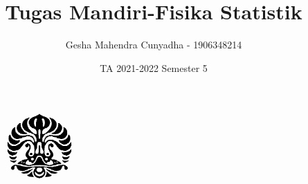 \documentclass[12 pt]{article}
\author{Gesha Mahendra Cunyadha - 1906348214}
\date{TA 2021-2022 Semester 5}
\title{Tugas Mandiri-Fisika Statistik}
\begin{document}
    \begin{titlepage}
        \begin{figure}
            \begin{center}
                \includegraphics[width=2.5cm]{pic/makara.png}
            \end{center}
        \end{figure}  
        \maketitle
        \thispagestyle{empty}
    \end{titlepage}


    
    
    
    
    
    
    
\end{document}
